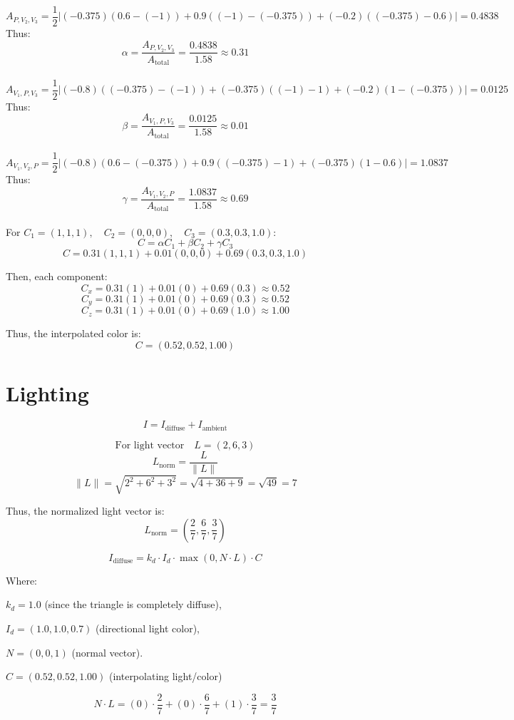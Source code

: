 \documentclass{article}
\begin{document}
$$
A_{P, V_2, V_3} = \frac{1}{2} |
(-0.375)(0.6 - (-1)) + 0.9((-1) - (-0.375)) + (-0.2)((-0.375) - 0.6)| = 0.4838
$$
Thus:
$$
\alpha = \frac{A_{P, V_2, V_3}}{A_{\text{total}}} = \frac{0.4838}{1.58} \approx 0.31
$$
\\
$$
A_{V_1, P, V_3} = \frac{1}{2} \left| (-0.8)((-0.375) - (-1)) + (-0.375)((-1) - 1) + (-0.2)(1 - (-0.375)) \right| = 0.0125
$$
Thus:
$$
\beta = \frac{A_{V_1, P, V_3}}{A_{\text{total}}} = \frac{0.0125}{1.58} \approx 0.01
$$
\\
$$
A_{V_1, V_2, P} = \frac{1}{2} \left| (-0.8)(0.6 - (-0.375)) + 0.9((-0.375) - 1) + (-0.375)(1 - 0.6) \right| = 1.0837
$$
Thus:
$$
\gamma = \frac{A_{V_1, V_2, P}}{A_{\text{total}}} = \frac{1.0837}{1.58} \approx 0.69
$$
\\

For $C_1 = (1, 1, 1), \quad C_2 = (0, 0, 0),\quad C_3 = (0.3, 0.3, 1.0)$:
$$
C = \alpha C_1 + \beta C_2 + \gamma C_3
$$
$$
C = 0.31 (1, 1, 1) + 0.01 (0, 0, 0) + 0.69 (0.3, 0.3, 1.0)
$$

Then, each component:
$$
C_x = 0.31(1) + 0.01(0) + 0.69(0.3) \approx 0.52
$$
$$
C_y = 0.31(1) + 0.01(0) + 0.69(0.3) \approx 0.52
$$
$$
C_z = 0.31(1) + 0.01(0) + 0.69(1.0) \approx 1.00
$$

Thus, the interpolated color is:
$$
C = (0.52, 0.52, 1.00)
$$


\newpage
\section{Lighting}

$$
\text{} I = I_{\text{diffuse}} + I_{\text{ambient}}
$$

$$
\text{For light vector} \quad L = (2, 6, 3)
$$
$$L_{\text{norm}} = \frac{L}{\|L\|}$$
$$
\|L\| = \sqrt{2^2 + 6^2 + 3^2} = \sqrt{4 + 36 + 9} = \sqrt{49} = 7
$$

Thus, the normalized light vector is:
$$
L_{\text{norm}} = \left( \frac{2}{7}, \frac{6}{7}, \frac{3}{7} \right)
$$

$$
I_{\text{diffuse}} = k_d \cdot I_d \cdot \max(0, N \cdot L) \cdot C
$$

Where:

$k_{d} = 1.0$ (since the triangle is completely diffuse),

$I_{d} = (1.0, 1.0, 0.7)$ (directional light color),

$N = (0, 0, 1)$ (normal vector).

$C = (0.52, 0.52, 1.00)$ (interpolating light/color)

$$
N \cdot L = (0) \cdot \frac{2}{7} + (0) \cdot \frac{6}{7} + (1) \cdot \frac{3}{7} = \frac{3}{7}
$$
\end{document}
